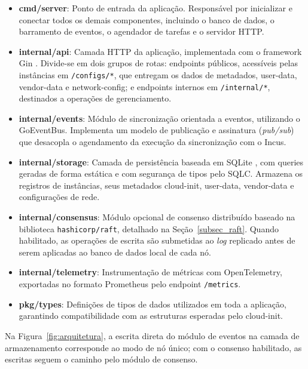 \begin{itemize}
    \item \textbf{cmd/server}: Ponto de entrada da aplicação. Responsável por inicializar e conectar todos os demais componentes, incluindo o banco de dados, o barramento de eventos, o agendador de tarefas e o servidor HTTP.

    \item \textbf{internal/api}: Camada HTTP da aplicação, implementada com o framework Gin \citep{gin2024}. Divide-se em dois grupos de rotas: endpoints públicos, acessíveis pelas instâncias em \texttt{/configs/*}, que entregam os dados de metadados, user-data, vendor-data e network-config; e endpoints internos em \texttt{/internal/*}, destinados a operações de gerenciamento.

    \item \textbf{internal/events}: Módulo de sincronização orientada a eventos, utilizando o GoEventBus. Implementa um modelo de publicação e assinatura (\textit{pub/sub}) que desacopla o agendamento da execução da sincronização com o Incus.

    \item \textbf{internal/storage}: Camada de persistência baseada em SQLite \citep{sqlite2024}, com queries geradas de forma estática e com segurança de tipos pelo SQLC. Armazena os registros de instâncias, seus metadados cloud-init, user-data, vendor-data e configurações de rede.

    \item \textbf{internal/consensus}: Módulo opcional de consenso distribuído baseado na biblioteca \texttt{hashicorp/raft}, detalhado na Seção~\ref{subsec_raft}. Quando habilitado, as operações de escrita são submetidas ao \textit{log} replicado antes de serem aplicadas ao banco de dados local de cada nó.

    \item \textbf{internal/telemetry}: Instrumentação de métricas com OpenTelemetry, exportadas no formato Prometheus pelo endpoint \texttt{/metrics}.

    \item \textbf{pkg/types}: Definições de tipos de dados utilizados em toda a aplicação, garantindo compatibilidade com as estruturas esperadas pelo cloud-init.
\end{itemize}

Na Figura~\ref{fig:arquitetura}, a escrita direta do módulo de eventos na camada de armazenamento corresponde ao modo de nó único; com o consenso habilitado, as escritas seguem o caminho pelo módulo de consenso.

